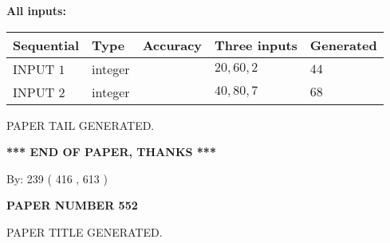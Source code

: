 \documentclass[12pt]{article}
\begin{document}
   
   
   
\noindent\vspace{0.1in}\hspace{-0.08in} {\textbf{\Large{All inputs: }}}
   
   
  
  
\noindent\begin{tabular}{|l|l|l|l|l|}
\hline
 Sequential & Type & Accuracy & Three inputs & Generated \\ 
\hline
 
 
  INPUT $  1 $ & integer &  & $
 20
 , 
 60
 , 
 2
 $ & $ 44 $ 
 \\  \hline  
 
 
  INPUT $  2 $ & integer &  & $
 40
 , 
 80
 , 
 7
 $ & $ 68 $ 
 \\  \hline  
 \end{tabular}
   
   
   
   
   
   
 \vspace{0.2in}
 
   
   
\vspace{2.0in} PAPER TAIL GENERATED.
   
   
   
   
\vspace{1.0in} 
{\textbf{\large{ *** END OF PAPER, THANKS *** }}} 
   
   
\hspace{1.0in} By: 
 239 ( 416 ,  613 )
   
   
   
   
\newpage 
\setcounter{page}{ 
   552001 } 
   
   
   
   
 {\textbf{ \Large{ PAPER NUMBER  552  }}}
   
   
\vspace{0.2in}
   
   
   
   
   
   
   
   
 \vspace{0.2in}
 
 
 
 
   
   
 PAPER TITLE GENERATED.
   
   
   
\vspace{0.2in}
   
\end{document}

